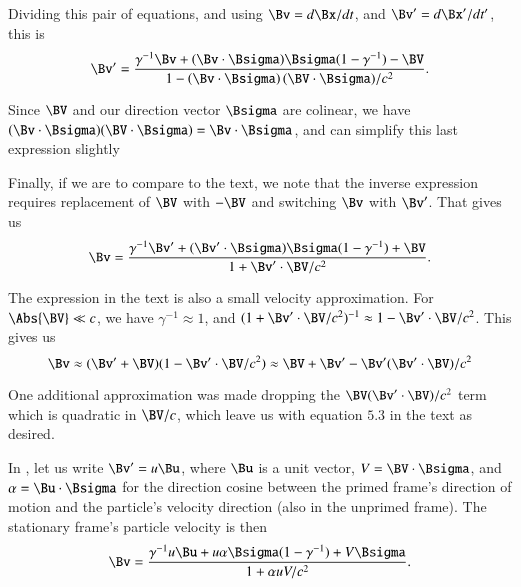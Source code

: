 {Dividing this pair of equations, and using \(\Bv = d\Bx/dt\), and \(\Bv' = d\Bx'/dt'\), this is
%
\begin{equation}\label{eqn:relativisticElectrodynamicsA1:240}
\Bv' = \frac{\gamma^{-1} \Bv + (\Bv \cdot \Bsigma) \Bsigma (1 - \gamma^{-1}) - \BV}{ 1 - \left( \Bv \cdot \Bsigma \right) (\BV \cdot \Bsigma)/c^2 }.
\end{equation}

Since \(\BV\) and our direction vector \(\Bsigma\) are colinear, we have \((\Bv \cdot \Bsigma) (\BV \cdot \Bsigma) = \Bv \cdot \Bsigma\), and can simplify this last expression slightly


Finally, if we are to compare to the text, we note that the inverse expression requires replacement of \(\BV\) with \(-\BV\) and switching \(\Bv\) with \(\Bv'\).  That gives us
%
\begin{equation}\label{eqn:relativisticElectrodynamicsA1:250i}
\Bv = \frac{\gamma^{-1} \Bv' + (\Bv' \cdot \Bsigma) \Bsigma (1 - \gamma^{-1}) + \BV}{ 1 + \Bv' \cdot \BV/c^2 }.
\end{equation}

The expression in the text is also a small velocity approximation.  For \(\Abs{\BV} \ll c\), we have \(\gamma^{-1} \approx 1\), and \((1 + \Bv' \cdot \BV/c^2)^{-1} \approx 1 - \Bv' \cdot \BV/c^2\).  This gives us
%
\begin{equation}\label{eqn:relativisticElectrodynamicsA1:250a}
\Bv \approx (\Bv' + \BV)( 1 - \Bv' \cdot \BV/c^2 ) \approx \BV + \Bv' - \Bv' (\Bv' \cdot \BV)/c^2
\end{equation}

One additional approximation was made dropping the \(\BV (\Bv' \cdot \BV)/c^2\) term which is quadratic in \(\BV/c\), which leave us with equation \(5.3\) in the text as desired.



In , let us write \(\Bv' = u \Bu\), where \(\Bu\) is a unit vector, \(V = \BV \cdot \Bsigma\), and \(\alpha = \Bu \cdot \Bsigma\) for the direction cosine between the primed frame's direction of motion and the particle's velocity direction (also in the unprimed frame).  The stationary frame's particle velocity is then
%
\begin{equation}\label{eqn:relativisticElectrodynamicsA1:260}
\Bv = \frac{\gamma^{-1} u \Bu + u \alpha \Bsigma (1 - \gamma^{-1}) + V \Bsigma}{ 1 + \alpha u V/c^2 }.
\end{equation}

}
